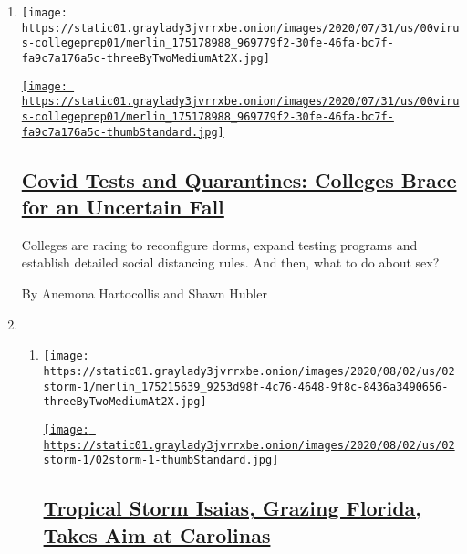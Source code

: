 \begin{enumerate}
\def\labelenumi{\arabic{enumi}.}
\item
  \texttt{[image: https://static01.graylady3jvrrxbe.onion/images/2020/07/31/us/00virus-collegeprep01/merlin\_175178988\_969779f2-30fe-46fa-bc7f-fa9c7a176a5c-threeByTwoMediumAt2X.jpg]}

  \href{/2020/08/02/us/covid-college-reopening.html}{\texttt{[image: https://static01.graylady3jvrrxbe.onion/images/2020/07/31/us/00virus-collegeprep01/merlin\_175178988\_969779f2-30fe-46fa-bc7f-fa9c7a176a5c-thumbStandard.jpg]}}

  \hypertarget{covid-tests-and-quarantines-colleges-brace-for-an-uncertain-fall}{%
  \subsection{\texorpdfstring{\href{/2020/08/02/us/covid-college-reopening.html}{Covid
  Tests and Quarantines: Colleges Brace for an Uncertain
  Fall}}{Covid Tests and Quarantines: Colleges Brace for an Uncertain Fall}}\label{covid-tests-and-quarantines-colleges-brace-for-an-uncertain-fall}}

  Colleges are racing to reconfigure dorms, expand testing programs and
  establish detailed social distancing rules. And then, what to do about
  sex?

  By Anemona Hartocollis and Shawn Hubler
\item
  \begin{enumerate}
  \def\labelenumii{\arabic{enumii}.}
  \item
    \texttt{[image: https://static01.graylady3jvrrxbe.onion/images/2020/08/02/us/02storm-1/merlin\_175215639\_9253d98f-4c76-4648-9f8c-8436a3490656-threeByTwoMediumAt2X.jpg]}

    \href{/2020/08/02/us/tropical-storm-isaias-florida-carolina.html}{\texttt{[image: https://static01.graylady3jvrrxbe.onion/images/2020/08/02/us/02storm-1/02storm-1-thumbStandard.jpg]}}

    \hypertarget{tropical-storm-isaias-grazing-florida-takes-aim-at-carolinas}{%
    \subsection{\texorpdfstring{\href{/2020/08/02/us/tropical-storm-isaias-florida-carolina.html}{Tropical
    Storm Isaias, Grazing Florida, Takes Aim at
    Carolinas}}{Tropical Storm Isaias, Grazing Florida, Takes Aim at Carolinas}}\label{tropical-storm-isaias-grazing-florida-takes-aim-at-carolinas}}


\end{enumerate}
\end{enumerate}
